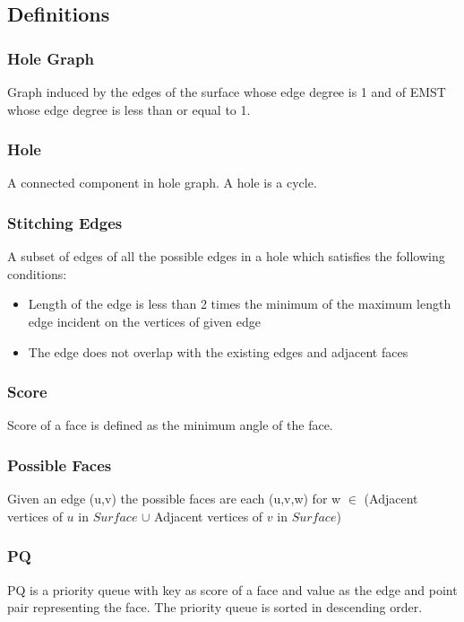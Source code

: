 \documentclass[preprint,5p,times,twocolumn]{elsarticle}
\begin{document}
\subsection{Definitions}

\subsubsection{Hole Graph}Graph induced by the edges of the surface whose edge degree is 1 and of EMST whose edge degree is less than or equal to 1.

\subsubsection{Hole}A connected component in hole graph. A hole is a cycle. 

\subsubsection{Stitching Edges} A subset of edges of all the possible edges in a hole which satisfies the following conditions:
\begin{itemize}
	\item Length of the edge is less than 2 times the minimum of the maximum length edge incident on the vertices of given edge
	\item The edge does not overlap with the existing edges and adjacent faces  
\end{itemize}

\subsubsection{Score} Score of a face is defined as the minimum angle of the face.

\subsubsection{Possible Faces} Given an edge (u,v) the possible faces are each (u,v,w) for w $ \in $ (Adjacent vertices of $ u $ in $ Surface  $ $ \cup $ Adjacent vertices of $ v $ in $Surface $)

\subsubsection{PQ} PQ is a priority queue with key as score of a face and value as the edge and point pair representing the face. The priority queue is sorted in descending order.
\end{document}
